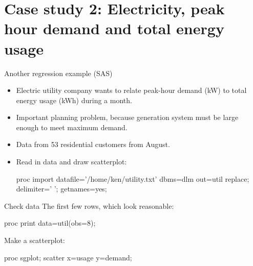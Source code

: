 \documentclass[unknownkeysallowed]{beamer}\usepackage[]{graphicx}\usepackage[]{color}
\begin{document}

\section{Case study 2: Electricity, peak hour demand and total energy usage}

\frame{\sectionpage}


\begin{frame}[fragile]{Another regression example (SAS)}

  \begin{itemize}

  \item Electric utility company wants to relate peak-hour demand (kW)
    to total energy usage (kWh) during a month.
  \item Important planning problem, because generation system must be
    large enough to meet maximum demand.
  \item Data from 53 residential customers from August.
  \item Read in data and draw scatterplot:
    \begin{Datastep}
proc import
  datafile='/home/ken/utility.txt'
    dbms=dlm
    out=util
    replace;
  delimiter=' ';
  getnames=yes;
    \end{Datastep}
    

  \end{itemize}
  
\end{frame}

\begin{frame}[fragile]{Check data}
  The first few rows, which look reasonable:

  \begin{Sascode}[store=ca]
proc print data=util(obs=8);    
  \end{Sascode}
  

Make a scatterplot:

    \begin{Sascode}[store=dda]
proc sgplot;
  scatter x=usage y=demand;
    \end{Sascode}

  
\end{frame}
\end{document}
